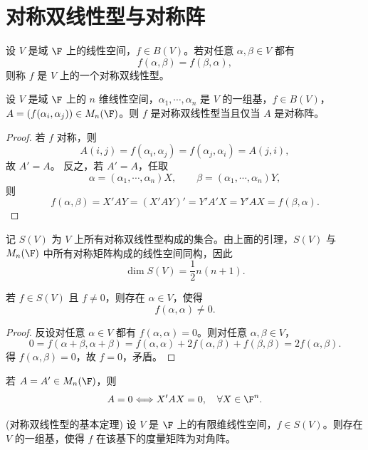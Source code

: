 \section{对称双线性型与对称阵}
\begin{definition}[对称双线性型]\label{p1:concept:c7-l668}
	设 $V$ 是域 $\F$ 上的线性空间，$f\in B(V)$。若对任意 $\alpha,\beta\in V$ 都有
	\[
	f(\alpha,\beta)=f(\beta,\alpha),
	\]
	则称 $f$ 是 $V$ 上的一个对称双线性型。
\end{definition}

\begin{lemma}
	设 $V$ 是域 $\F$ 上的 $n$ 维线性空间，$\alpha_1,\cdots,\alpha_n$ 是 $V$ 的一组基，$f\in B(V)$，$A=(f(\alpha_i,\alpha_j))\in M_n(\F)$。则 $f$ 是对称双线性型当且仅当 $A$ 是对称阵。
\end{lemma}

\begin{proof}
	若 $f$ 对称，则
	\[
	A(i,j)=f(\alpha_i,\alpha_j)=f(\alpha_j,\alpha_i)=A(j,i),
	\]
	故 $A'=A$。
	反之，若 $A'=A$，任取
	\[
	\alpha=(\alpha_1,\cdots,\alpha_n)X,
	\qquad
	\beta=(\alpha_1,\cdots,\alpha_n)Y,
	\]
	则
	\[
	f(\alpha,\beta)=X'AY=(X'AY)'=Y'A'X=Y'AX=f(\beta,\alpha).
	\]
\end{proof}

记 $S(V)$ 为 $V$ 上所有对称双线性型构成的集合。由上面的引理，$S(V)$ 与 $M_n(\F)$ 中所有对称矩阵构成的线性空间同构，因此
\[
\dim S(V)=\frac{1}{2}n(n+1).
\]

\begin{lemma}
	若 $f\in S(V)$ 且 $f\ne 0$，则存在 $\alpha\in V$，使得
	\[
	f(\alpha,\alpha)\ne 0.
	\]
\end{lemma}

\begin{proof}
	反设对任意 $\alpha\in V$ 都有 $f(\alpha,\alpha)=0$。则对任意 $\alpha,\beta\in V$，
	\[
	0=f(\alpha+\beta,\alpha+\beta)
	=f(\alpha,\alpha)+2f(\alpha,\beta)+f(\beta,\beta)
	=2f(\alpha,\beta).
	\]
	得 $f(\alpha,\beta)=0$，故 $f=0$，矛盾。
\end{proof}

\begin{corollary}
	若 $A=A'\in M_n(\F)$，则
	\[
	A=0
	\Longleftrightarrow
	X'AX=0,\quad \forall X\in\F^n.
	\]
\end{corollary}

\begin{theorem}(对称双线性型的基本定理)
	设 $V$ 是 $\F$ 上的有限维线性空间，$f\in S(V)$。则存在 $V$ 的一组基，使得 $f$ 在该基下的度量矩阵为对角阵。
\end{theorem}


